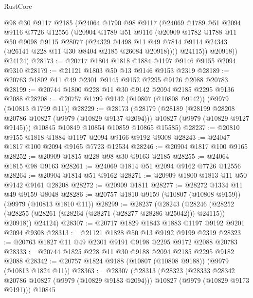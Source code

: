 \begin{lexlean}{RustCore}
\begin{coremodule}
          @98
          @30
          @9117
          @2185
          (@24064
            @1790
            @98
            @9117
            (@24069
              @1789
              @51
              @2094
              @9116
              @7726
              @12556
              (@20904
                @1789
                @51
                @9116
                (@20909
                  @1782
                  @1788
                  @11
                  @50
                  @9098
                  @9115
                  @28077
                  (@24329
                    @1498
                    @11
                    @49
                    @7814
                    @9114
                    @24343
                    (@26141 @228 @11 @30 @8404 @2185 @26084 @20918))))
              @24115))
          @20918))
      @24124)
@28173 := @20717 @1804 @1818 @1884 @1197 @9146 @9155 @2094 @9310
@28179 := @21121 @1803 @50 @13 @9146 @9153 @2319
@28189 := @20763 @1802 @11 @49 @2301 @9145 @9152 @2295 @9126 @2088 @20783
@28199 := @20744 @1800 @228 @11 @30 @9142 @2094 @2185 @2295 @9136 @2088
@28208 := @20757 @1799 @9142 (@10807 (@10808 @9142)) (@9979 (@10813 @1799 @11))
@28229 := @28173
    (@28179
      (@28189
        (@28199 @28208 @20786 @10827 (@9979 (@10829 @9137 @2094)))
        @10827
        (@9979 (@10829 @9127 @9145)))
      @10845
      @10849
      @10854
      @10859
      @10865
      @15585)
@28237 := @20810 @9155 @1818 @1884 @1197 @2094 @9166 @9192 @9308
@28243 := @24047 @1817 @100 @2094 @9165 @7723 @12534
@28246 := @20904 @1817 @100 @9165
@28252 := @20909 @1815 @228 @98 @30 @9163 @2185
@28255 := @24064 @1815 @98 @9163
@28261 := @24069 @1814 @51 @2094 @9162 @7726 @12556
@28264 := @20904 @1814 @51 @9162
@28271 := @20909 @1800 @1813 @11 @50 @9142 @9161 @28208
@28272 := @20909 @1811
@28277 := @28272 @1334 @11 @49 @9159 @8048
@28286 := @20757 @1810 @9159 (@10807 (@10808 @9159)) (@9979 (@10813 @1810 @11))
@28299 := @28237
    (@28243
      (@28246 (@28252 (@28255 (@28261 (@28264 (@28271 (@28277 @28286 @25042))) @24115)) @20918))
      @24124)
@28307 := @20717 @1829 @1843 @1883 @1197 @9192 @9201 @2094 @9308
@28313 := @21121 @1828 @50 @13 @9192 @9199 @2319
@28323 := @20763 @1827 @11 @49 @2301 @9191 @9198 @2295 @9172 @2088 @20783
@28333 := @20744 @1825 @228 @11 @30 @9188 @2094 @2185 @2295 @9182 @2088
@28342 := @20757 @1824 @9188 (@10807 (@10808 @9188)) (@9979 (@10813 @1824 @11))
@28363 := @28307
    (@28313
      (@28323
        (@28333 @28342 @20786 @10827 (@9979 (@10829 @9183 @2094)))
        @10827
        (@9979 (@10829 @9173 @9191)))
      @10845

\end{coremodule}
\end{lexlean}
